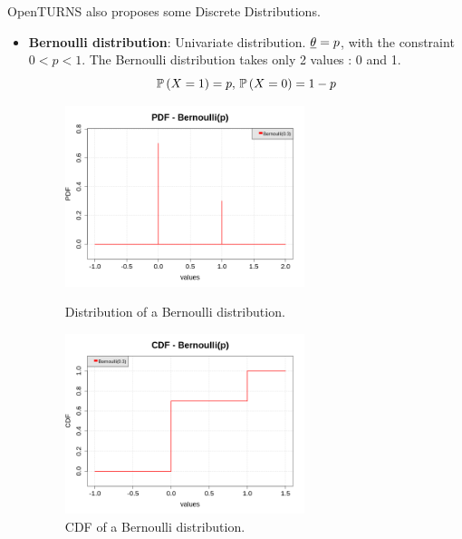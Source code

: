 {\begin{itemize}
\end{itemize}



OpenTURNS also proposes some Discrete Distributions.

\begin{itemize}

\item {\bf Bernoulli distribution}: Univariate distribution. ${\underline{\theta}} = p$, with the constraint $0<p<1$. The Bernoulli distribution takes only 2 values : 0 and 1.
\begin{equation}
{\mathbb P}\left( X = 1 \right) = p, \, {\mathbb P}\left( X = 0 \right) = 1-p
\end{equation}

\begin{figure}[H]
\begin{minipage}{8cm}
\begin{center}
\includegraphics[width=7cm]{Figures/pdf_Bernoulli.png}
\caption{Distribution of a Bernoulli distribution.}
\label{PDFBernoulli}
\end{center}
\end{minipage}
\hfill
\begin{minipage}{8cm}
\begin{center}
\includegraphics[width=7cm]{Figures/cdf_Bernoulli.png}
\caption{CDF of a Bernoulli distribution.}
\label{CDFBernoulli}
\end{center}
\end{minipage}
\end{figure}


\end{itemize}}
